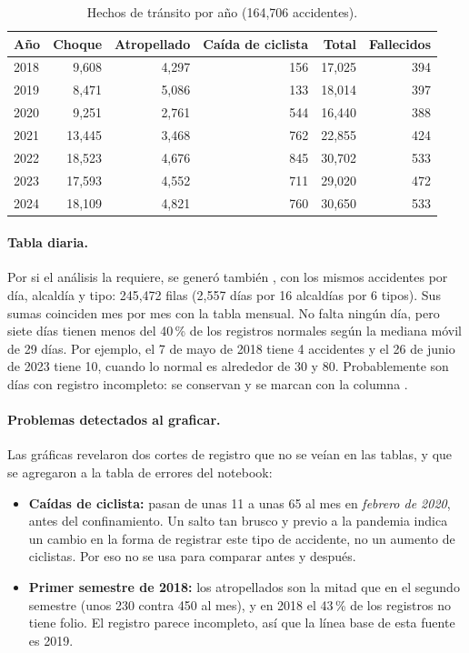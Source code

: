 \begin{table}[h]
\centering
\caption{Hechos de tránsito por año (164,706 accidentes).}\label{tab:transito}
\small
\begin{tabular}{lrrrrr}
\toprule
\textbf{Año} & \textbf{Choque} & \textbf{Atropellado} & \textbf{Caída de ciclista} & \textbf{Total} & \textbf{Fallecidos}\\
\midrule
2018 & 9,608 & 4,297 & 156 & 17,025 & 394\\
2019 & 8,471 & 5,086 & 133 & 18,014 & 397\\
2020 & 9,251 & 2,761 & 544 & 16,440 & 388\\
2021 & 13,445 & 3,468 & 762 & 22,855 & 424\\
2022 & 18,523 & 4,676 & 845 & 30,702 & 533\\
2023 & 17,593 & 4,552 & 711 & 29,020 & 472\\
2024 & 18,109 & 4,821 & 760 & 30,650 & 533\\
\bottomrule
\end{tabular}
\end{table}

\paragraph{Tabla diaria.} Por si el análisis la requiere, se generó también
, con los mismos accidentes por día, alcaldía y tipo: 245,472 filas
(2,557 días por 16 alcaldías por 6 tipos). Sus sumas coinciden mes por mes con la tabla mensual. No
falta ningún día, pero siete días tienen menos del 40\,\% de los registros normales según la mediana
móvil de 29 días. Por ejemplo, el 7 de mayo de 2018 tiene 4 accidentes y el 26 de junio de 2023 tiene
10, cuando lo normal es alrededor de 30 y 80. Probablemente son días con registro incompleto: se
conservan y se marcan con la columna .

\paragraph{Problemas detectados al graficar.} Las gráficas revelaron dos cortes de registro que
no se veían en las tablas, y que se agregaron a la tabla de errores del notebook:
\begin{itemize}
  \item \textbf{Caídas de ciclista:} pasan de unas 11 a unas 65 al mes en \emph{febrero de 2020},
        antes del confinamiento. Un salto tan brusco y previo a la pandemia indica un cambio en la
        forma de registrar este tipo de accidente, no un aumento de ciclistas. Por eso no se usa para
        comparar antes y después.
  \item \textbf{Primer semestre de 2018:} los atropellados son la mitad que en el segundo semestre
        (unos 230 contra 450 al mes), y en 2018 el 43\,\% de los registros no tiene folio. El registro
        parece incompleto, así que la línea base de esta fuente es 2019.
\end{itemize}

